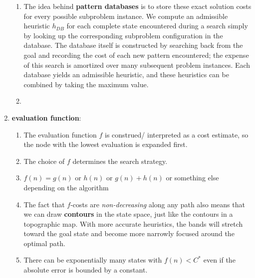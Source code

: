 \begin{enumerate}
\begin{enumerate}
        \item The idea behind \textbf{pattern databases} is to store these exact solution costs for every possible subproblem instance.
        We compute an admissible heuristic $h_{DB}$ for each complete state encountered during a search simply by looking up the corresponding subproblem configuration in the database. 
        The database itself is constructed by searching back from the goal and recording the cost of each new pattern encountered; the expense of this search is amortized over many subsequent problem instances.
        Each database yields an admissible heuristic, and these heuristics can be combined by taking the maximum value.
        \hfill \cite{ai/book/Artificial-Intelligence-A-Modern-Approach/Russell-Norvig}

        \item 
        \hfill \cite{ai/book/Artificial-Intelligence-A-Modern-Approach/Russell-Norvig}
    \end{enumerate}

    \item \textbf{evaluation function}:
    \begin{enumerate}
        \item The evaluation function $f$ is construed/ interpreted as a cost estimate, so the node with the lowest evaluation is expanded first.
        \hfill \cite{ai/book/Artificial-Intelligence-A-Modern-Approach/Russell-Norvig}
        
        \item The choice of $f$ determines the search strategy.
        \hfill \cite{ai/book/Artificial-Intelligence-A-Modern-Approach/Russell-Norvig}

        \item $f(n) = g(n)$ or $h(n)$ or $g(n)+h(n)$ or something else depending on the algorithm

        \item The fact that $f$-costs are \textit{non-decreasing} along any path also means that we can draw \textbf{contours} in the state space, just like the contours in a topographic map. 
        With more accurate heuristics, the bands will stretch toward the goal state and become more narrowly focused around the optimal path.
        \hfill \cite{ai/book/Artificial-Intelligence-A-Modern-Approach/Russell-Norvig}

        \item There can be exponentially many states with $f(n) < C^\ast$ even if the absolute error is bounded by a constant.
        \hfill \cite{ai/book/Artificial-Intelligence-A-Modern-Approach/Russell-Norvig}


\end{enumerate}
\end{enumerate}
